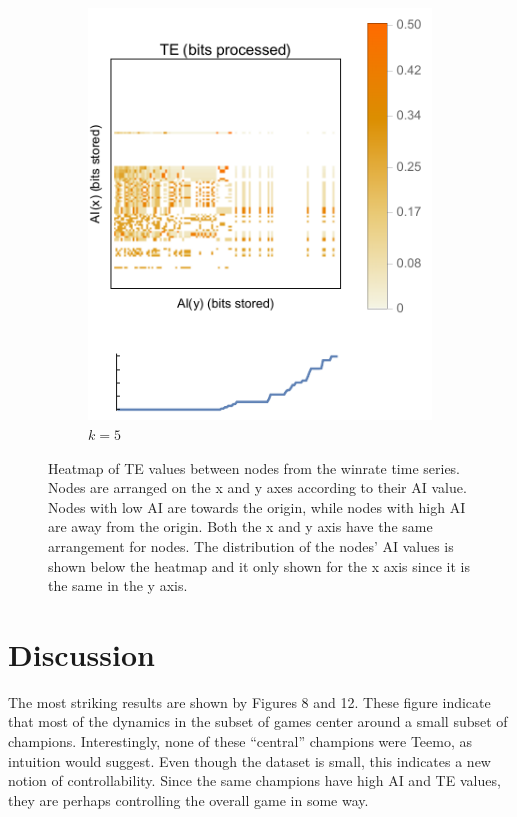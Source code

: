 \documentclass[twoside]{article}
\begin{document}
\begin{multicols}{2}
\begin{figure}
\begin{subfigure}{.5\textwidth}
  \includegraphics[width=0.9\linewidth]{winrate_AI_vs_AI_vs_TE_Heatmap_k5.pdf}
  \caption{$k=5$}
  \label{fig:sub2}
\end{subfigure}
\caption{Heatmap of TE values between nodes from the winrate time series. Nodes are arranged on the x and y axes according to their AI value. Nodes with low AI are towards the origin, while nodes with high AI are away from the origin. Both the x and y axis have the same arrangement for nodes. The distribution of the nodes' AI values is shown below the heatmap and it only shown for the x axis since it is the same in the y axis.}
\label{fig:test}
\end{figure}


\section{Discussion}
The most striking results are shown by Figures 8 and 12. These figure indicate that most of the dynamics in the subset of games center around a small subset of champions. Interestingly, none of these ``central'' champions were Teemo, as intuition would suggest. Even though the dataset is small, this indicates a new notion of controllability. Since the same champions have high AI and TE values, they are perhaps controlling the overall game in some way. 


\end{multicols}
\end{document}
